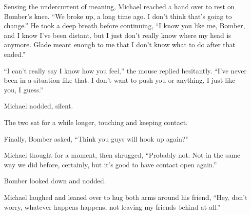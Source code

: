 Sensing the undercurrent of meaning, Michael reached a hand over to rest on Bomber's knee. ``We broke up, a long time ago. I don't think that's going to change.'' He took a deep breath before continuing, ``I know you like me, Bomber, and I know I've been distant, but I just don't really know where my head is anymore. Glade meant enough to me that I don't know what to do after that ended.''

``I can't really say I know how you feel,'' the mouse replied hesitantly. ``I've never been in a situation like that. I don't want to push you or anything, I just like you, I guess.''

Michael nodded, silent.

The two sat for a while longer, touching and keeping contact.

Finally, Bomber asked, ``Think you guys will hook up again?''

Michael thought for a moment, then shrugged, ``Probably not. Not in the same way we did before, certainly, but it's good to have contact open again.''

Bomber looked down and nodded.

Michael laughed and leaned over to hug both arms around his friend, ``Hey, don't worry, whatever happens happens, not leaving my friends behind at all.''

